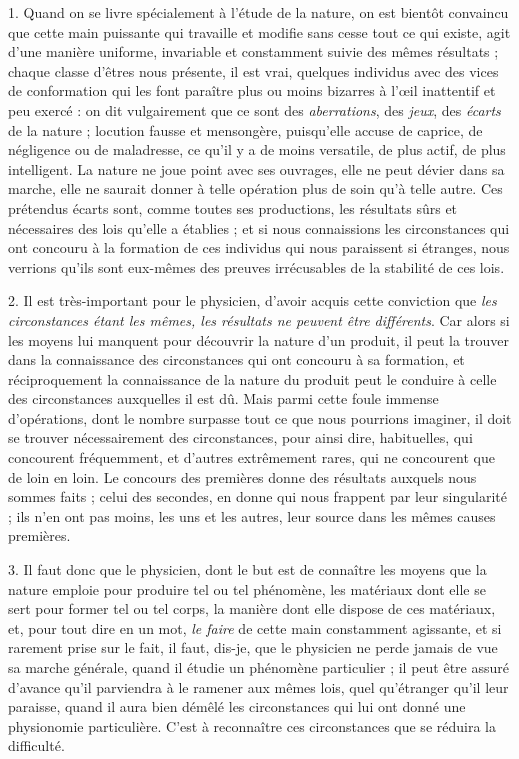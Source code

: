 \documentclass[a4paper, 11pt, oneside, polutonikogreek, french]{article}
\begin{document}
1. Quand on se livre spécialement à l'étude de la nature, on est bientôt convaincu que cette main puissante qui travaille et modifie sans cesse tout ce qui existe, agit d'une manière uniforme, invariable et constamment suivie des mêmes résultats ; chaque classe d'êtres nous présente, il est vrai, quelques individus avec des vices de conformation qui les font paraître plus ou moins bizarres à l'œil inattentif et peu exercé : on dit vulgairement que ce sont des \emph{aberrations}, des \emph{jeux}, des \emph{écarts} de la nature ; locution fausse et mensongère, puisqu'elle accuse de caprice, de négligence ou de maladresse, ce qu'il y a de moins versatile, de plus actif, de plus intelligent. La nature ne joue point avec ses ouvrages, elle ne peut dévier dans sa marche, elle ne saurait donner à telle opération plus de soin qu'à telle autre. Ces prétendus écarts sont, comme toutes ses productions, les résultats sûrs et nécessaires des lois qu'elle a établies ; et si nous connaissions les circonstances qui ont concouru à la formation de ces individus qui nous paraissent si étranges, nous verrions qu'ils sont eux-mêmes des preuves irrécusables de la stabilité de ces lois.

2. Il est très-important pour le physicien, d'avoir acquis cette conviction que \emph{les circonstances étant les mêmes, les résultats ne peuvent être différents}. Car alors si les moyens lui manquent pour découvrir la nature d'un produit, il peut la trouver dans la connaissance des circonstances qui ont concouru à sa formation, et réciproquement la connaissance de la nature du produit peut le conduire à celle des circonstances auxquelles il est dû. Mais parmi cette foule immense d'opérations, dont le nombre surpasse tout ce que nous pourrions imaginer, il doit se trouver nécessairement des circonstances, pour ainsi dire, habituelles, qui concourent fréquemment, et d'autres extrêmement rares, qui ne concourent que de loin en loin. Le concours des premières donne des résultats auxquels nous sommes faits ; celui des secondes, en donne qui nous frappent par leur singularité ; ils n'en ont pas moins, les uns et les autres, leur source dans les mêmes causes premières.

3. Il faut donc que le physicien, dont le but est de connaître les moyens que la nature emploie pour produire tel ou tel phénomène, les matériaux dont elle se sert pour former tel ou tel corps, la manière dont elle dispose de ces matériaux, et, pour tout dire en un mot, \emph{le faire} de cette main constamment agissante, et si rarement prise sur le fait, il faut, dis-je, que le physicien ne perde jamais de vue sa marche générale, quand il étudie un phénomène particulier ; il peut être assuré d'avance qu'il parviendra à le ramener aux mêmes lois, quel qu’étranger qu'il leur paraisse, quand il aura bien démêlé les circonstances qui lui ont donné une physionomie particulière. C'est à reconnaître ces circonstances que se réduira la difficulté.
\end{document}
